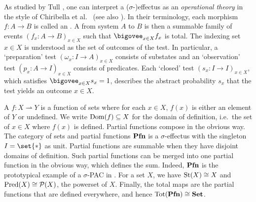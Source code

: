 \documentclass[%
	submission,
copyright,creativecommons,UKenglish]{eptcs}
\begin{document}
\begin{remark}
\label{remark:operational-interpretation}
As studied by Tull \cite{tull2016,tull2019phdthesis},
one can interpret a ($\sigma$-)effectus as
an \emph{operational theory} in the style
of Chiribella et
al.~\cite{chiribella2010probabilistic,
ChiribellaDP2015,DArianoCP2017}
(see also \cite[\S\,6.1, 6.2]{Cho2019PhD}).
In their terminology,
each morphism $f\colon A\to B$ is called an .
A  from system $A$ to $B$
is then a summable family of events
$(f_x\colon A\to B)_{x\in X}$
such that $\bigovee_{x\in X} f_x$ is total.
The indexing set $x\in X$ is understood as
the set of outcomes of the test.
In particular,
a `preparation' test $(\omega_x\colon I\to A)_{x\in X}$
consists of substates and
an `observation' test $(p_x\colon A\to I)_{x\in X}$
consists of predicates.
Each `closed' test $(s_x\colon I\to I)_{x\in X}$,
which satisfies $\bigovee_{x\in X} s_x=1$, describes the
abstract probability $s_x$ that the test yields an outcome $x\in X$.
\end{remark}

\begin{example}\label{ex:pfn}
  A  $f\colon X\rightharpoonup Y$ is
  a function of sets
  where for each $x\in X$, $f(x)$ is either an element of $Y$ or
  undefined. We write $\operatorname{Dom}(f)\subseteq X$ for the domain of definition,
  i.e.\ the set of $x\in X$
  where $f(x)$ is defined. Partial functions compose in the obvious
  way. The category of sets and partial functions $\mathbf{Pfn}$ is a
  $\sigma$-effectus with the singleton $I=\set{*}$ as unit.
  Partial functions are summable when they have disjoint
  domains of definition.
  Such partial functions can be merged into one partial function
  in the obvious way, which defines the sum.
  Indeed, $\mathbf{Pfn}$ is the prototypical example of a $\sigma$-PAC
  in \cite{ArbibM1980,ManesA1986}.
  For a set $X$, we have
  $\mathrm{St}(X) \cong X$ and $\mathrm{Pred}(X) \cong \mathcal{P}(X)$, the powerset of $X$.
  Finally, the total maps are the partial functions that are defined
  everywhere, and hence $\mathrm{Tot}(\mathbf{Pfn}) \cong \mathbf{Set}$.
\end{example}
\end{document}
